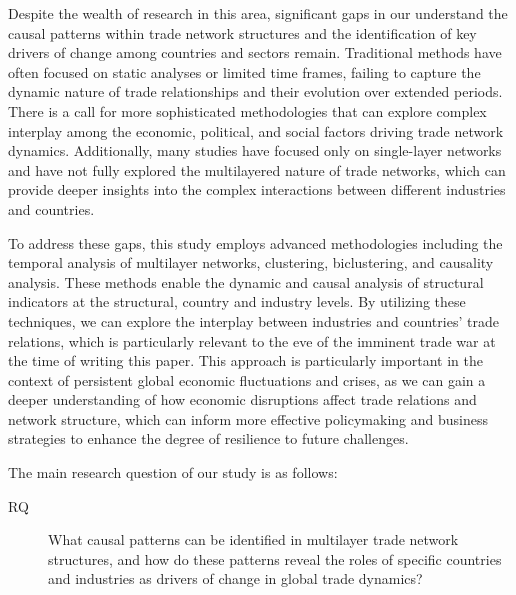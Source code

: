 \documentclass[preprint, 3p,
authoryear]{elsarticle} %
\begin{document}
Despite the wealth of research in this area, significant gaps in our
understand the causal patterns within trade network structures and the
identification of key drivers of change among countries and sectors
remain. Traditional methods have often focused on static analyses or
limited time frames, failing to capture the dynamic nature of trade
relationships and their evolution over extended periods. There is a call
for more sophisticated methodologies that can explore complex interplay
among the economic, political, and social factors driving trade network
dynamics. Additionally, many studies have focused only on single-layer
networks and have not fully explored the multilayered nature of trade
networks, which can provide deeper insights into the complex
interactions between different industries and countries.

To address these gaps, this study employs advanced methodologies
including the temporal analysis of multilayer networks, clustering,
biclustering, and causality analysis. These methods enable the dynamic
and causal analysis of structural indicators at the structural, country
and industry levels. By utilizing these techniques, we can explore the
interplay between industries and countries' trade relations, which is
particularly relevant to the eve of the imminent trade war at the time
of writing this paper. This approach is particularly important in the
context of persistent global economic fluctuations and crises, as we can
gain a deeper understanding of how economic disruptions affect trade
relations and network structure, which can inform more effective
policymaking and business strategies to enhance the degree of resilience
to future challenges.

The main research question of our study is as follows:

\begin{description}
\item[RQ\label{rq}] What causal patterns can be identified in multilayer trade network structures, and how do these patterns reveal the roles of specific countries and industries as drivers of change in global trade dynamics?
\end{description}
\end{document}
